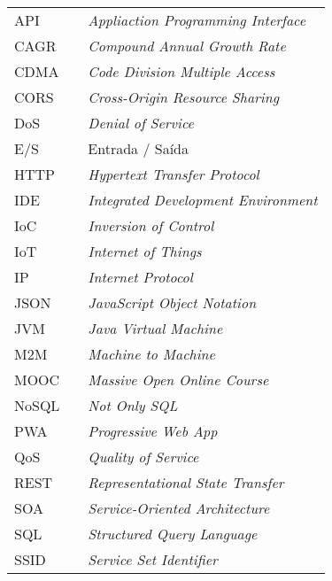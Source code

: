 \begin{table}[H]
\centering
\label{my-label}
\begin{tabular}{lll}
API   &  & \textit{Appliaction Programming Interface}                \\
CAGR  &  & \textit{Compound Annual Growth Rate}                      \\
CDMA  &  & \textit{Code Division Multiple Access}                    \\
CORS  &  & \textit{Cross-Origin Resource Sharing}                    \\
DoS   &  & \textit{Denial of Service}                                \\
E/S   &  & Entrada / Saída                                           \\
HTTP  &  & \textit{Hypertext Transfer Protocol}                      \\
IDE   &  & \textit{Integrated Development Environment}               \\
IoC   &  & \textit{Inversion of Control}                             \\
IoT   &  & \textit{Internet of Things}                               \\
IP    &  & \textit{Internet Protocol}                                \\
JSON  &  & \textit{JavaScript Object Notation}                       \\
JVM   &  & \textit{Java Virtual Machine}                             \\
M2M   &  & \textit{Machine to Machine}                               \\
MOOC  &  & \textit{Massive Open Online Course}                       \\
NoSQL &  & \textit{Not Only SQL}                                     \\
PWA   &  & \textit{Progressive Web App}                              \\
QoS   &  & \textit{Quality of Service}                               \\
REST  &  & \textit{Representational State Transfer}                  \\
SOA   &  & \textit{Service-Oriented Architecture}                    \\
SQL   &  & \textit{Structured Query Language}                        \\
SSID  &  & \textit{Service Set Identifier}                           \\

\end{tabular}
\end{table}
